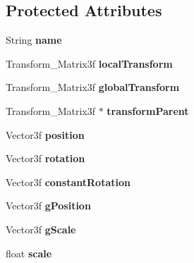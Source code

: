 \subsection*{Protected Attributes}
\begin{DoxyCompactItemize}
\item 
\mbox{\label{classprzurro_1_1_scene___object_aaac35f72f6665ffa1ca8c51ea5946532}} 
String {\bfseries name}
\item 
\mbox{\label{classprzurro_1_1_scene___object_a0fcf8057aa28fcb2bb3c38567b00dcbc}} 
Transform\+\_\+\+Matrix3f {\bfseries local\+Transform}
\item 
\mbox{\label{classprzurro_1_1_scene___object_ac7348f2f4ce4de617dd13ed397f9f5a5}} 
Transform\+\_\+\+Matrix3f {\bfseries global\+Transform}
\item 
\mbox{\label{classprzurro_1_1_scene___object_a1faaab27bbfd9a2a085909bd9b21df2d}} 
Transform\+\_\+\+Matrix3f $\ast$ {\bfseries transform\+Parent}
\item 
\mbox{\label{classprzurro_1_1_scene___object_ab87ed4d77cc6d0c5bfc514374f732db4}} 
Vector3f {\bfseries position}
\item 
\mbox{\label{classprzurro_1_1_scene___object_a91d82fc80f0f6a90499d243c19c552d3}} 
Vector3f {\bfseries rotation}
\item 
\mbox{\label{classprzurro_1_1_scene___object_a3a43dd2885156610f464ef719a6ba904}} 
Vector3f {\bfseries constant\+Rotation}
\item 
\mbox{\label{classprzurro_1_1_scene___object_abef811a5733b37e0dec439db1104f1c3}} 
Vector3f {\bfseries g\+Position}
\item 
\mbox{\label{classprzurro_1_1_scene___object_aaa3cd7bc3fd236d1d57d44268ab688d9}} 
Vector3f {\bfseries g\+Scale}
\item 
\mbox{\label{classprzurro_1_1_scene___object_a28dd1c1e0f702ca52d8d58c0f4944628}} 
float {\bfseries scale}
\end{DoxyCompactItemize}


